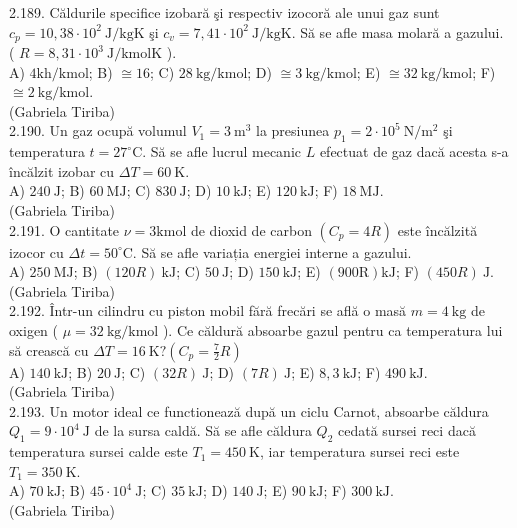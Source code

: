2.189. Căldurile specifice izobară şi respectiv izocoră ale unui gaz sunt $c_{p}=10,38 \cdot 10^{2} \mathrm{~J} / \mathrm{kgK}$ şi $c_{v}=7,41 \cdot 10^{2} \mathrm{~J} / \mathrm{kgK}$. Să se afle masa molară a gazului. ( $R=8,31 \cdot 10^{3} \mathrm{~J} / \mathrm{kmolK}$ ).\\ A) $4 \mathrm{kh} / \mathrm{kmol}$; B) $\cong 16$; C) $28 \mathrm{~kg} / \mathrm{kmol}$; D) $\cong 3 \mathrm{~kg} / \mathrm{kmol}$; E) $\cong 32 \mathrm{~kg} / \mathrm{kmol}$; F) $\cong 2 \mathrm{~kg} / \mathrm{kmol}$.\\ (Gabriela Tiriba)\\

2.190. Un gaz ocupă volumul $V_{1}=3 \mathrm{~m}^{3}$ la presiunea $p_{1}=2 \cdot 10^{5} \mathrm{~N} / \mathrm{m}^{2}$ şi temperatura $t=27^{\circ} \mathrm{C}$. Să se afle lucrul mecanic $L$ efectuat de gaz dacă acesta s-a încălzit izobar cu $\Delta T=60 \mathrm{~K}$.\\ A) $240 \mathrm{~J}$; B) $60 \mathrm{~MJ}$; C) $830 \mathrm{~J}$; D) $10 \mathrm{~kJ}$; E) $120 \mathrm{~kJ}$; F) $18 \mathrm{~MJ}$.\\ (Gabriela Tiriba)\\

2.191. O cantitate $\nu=3 \mathrm{kmol}$ de dioxid de carbon $\left(C_{p}=4 R\right)$ este încălzită izocor cu $\Delta t=50^{\circ} \mathrm{C}$. Să se afle variația energiei interne a gazului.\\ A) $250 \mathrm{~MJ}$; B) $( 120 R ) \mathrm{~kJ}$; C) $50 \mathrm{~J}$; D) $150 \mathrm{~kJ}$; E) $(900 \mathrm{R}) \mathrm{kJ}$; F) $( 450 R ) \mathrm{~J}$.\\ (Gabriela Tiriba)\\

2.192. Într-un cilindru cu piston mobil fără frecări se află o masă $m=4 \mathrm{~kg}$ de oxigen ( $\mu=32 \mathrm{~kg} / \mathrm{kmol}$ ). Ce căldură absoarbe gazul pentru ca temperatura lui să crească cu $\Delta T=16 \mathrm{~K} ?\left(C_{p}=\frac{7}{2} R\right)$\\ A) $140 \mathrm{~kJ}$; B) $20 \mathrm{~J}$; C) $(32 R) \mathrm{~J}$; D) $(7 R) \mathrm{~J}$; E) $8,3 \mathrm{~kJ}$; F) $490 \mathrm{~kJ}$.\\ (Gabriela Tiriba)\\

2.193. Un motor ideal ce functionează după un ciclu Carnot, absoarbe căldura $Q_{1}=9 \cdot 10^{4} \mathrm{~J}$ de la sursa caldă. Să se afle căldura $Q_{2}$ cedată sursei reci dacă temperatura sursei calde este $T_{1}=450 \mathrm{~K}$, iar temperatura sursei reci este $T_{1}=350 \mathrm{~K}$.\\ A) $70 \mathrm{~kJ}$; B) $45 \cdot 10^{4} \mathrm{~J}$; C) $35 \mathrm{~kJ}$; D) $140 \mathrm{~J}$; E) $90 \mathrm{~kJ}$; F) $300 \mathrm{~kJ}$.\\ (Gabriela Tiriba)\\

